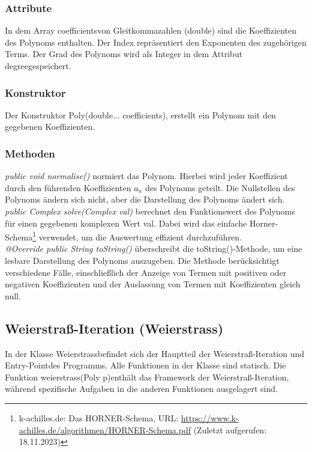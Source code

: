 \documentclass[12pt]{article}
\begin{document}
\subsubsection*{Attribute}
In dem Array \glqq coefficients\grqq\space von Gleitkommazahlen (double) sind die Koeffizienten des Polynoms enthalten. Der Index repräsentiert den Exponenten des zugehörigen Terms.
Der Grad des Polynoms wird als Integer in dem Attribut \glqq degree\grqq\space gespeichert. 

\subsubsection*{Konstruktor}
Der Konstruktor \glqq Poly(double... coefficients)\grqq, erstellt ein Polynom mit den gegebenen Koeffizienten.

\subsubsection*{Methoden}
\textit{public void normalise()} normiert das Polynom. Hierbei wird jeder Koeffizient durch den führenden Koeffizienten $a_n$ des Polynoms geteilt. Die Nullstellen des Polynoms ändern sich nicht, aber die Darstellung des Polynoms ändert sich.\\
\textit{public Complex solve(Complex val)} berechnet den Funktionswert des Polynoms für einen gegebenen komplexen Wert \glqq val\grqq. Dabei wird das einfache Horner-Schema\footnote{
    k-achilles.de: Das HORNER-Schema, URL: \url{https://www.k-achilles.de/algorithmen/HORNER-Schema.pdf} (Zuletzt aufgerufen: 18.11.2023)
} verwendet, um die Auswertung effizient durchzuführen. \\
\textit{@Override public String toString()} überschreibt die \glqq toString()\grqq -Methode, um eine lesbare Darstellung des Polynoms auszugeben. Die Methode berücksichtigt verschiedene Fälle, einschließlich der Anzeige von Termen mit positiven oder negativen Koeffizienten und der Auslassung von Termen mit Koeffizienten gleich null.

\subsection{Weierstraß-Iteration (Weierstrass)}
In der Klasse \glqq Weierstrass\grqq\space befindet sich der Hauptteil der Weierstraß-Iteration und \glqq Entry-Point\grqq\space des Programms. Alle Funktionen in der Klasse sind statisch. Die Funktion \glqq weierstrass(Poly p)\grqq\space enthält das Framework der Weierstraß-Iteration, während spezifische Aufgaben in die anderen Funktionen ausgelagert sind. %
\end{document}
